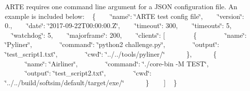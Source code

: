 A\+R\+TE requires one command line argument for a J\+S\+ON configuration file. An example is included below\+: ~\newline
 \{ ~\newline
 ~~\char`\"{}name\char`\"{}\+: \char`\"{}\+A\+R\+T\+E test config file\char`\"{}, ~\newline
 ~~\char`\"{}version\char`\"{}\+: 0., ~\newline
 ~~\char`\"{}date\char`\"{}\+: \char`\"{}2017-\/09-\/22\+T00\+:00\+:00.\+Z\char`\"{}, ~\newline
 ~~\char`\"{}timeout\char`\"{}\+: 300, ~\newline
 ~~\char`\"{}timeouts\char`\"{}\+: 5, ~\newline
 ~~\char`\"{}watchdog\char`\"{}\+: 5, ~\newline
 ~~\char`\"{}majorframe\char`\"{}\+: 200, ~\newline
 ~~\char`\"{}clients\char`\"{}\+: [ ~\newline
 ~~~~~~\{ ~\newline
 ~~~~~~\char`\"{}name\char`\"{}\+: \char`\"{}\+Pyliner\char`\"{}, ~\newline
 ~~~~~~\char`\"{}command\char`\"{}\+: \char`\"{}python2 challenge.\+py\char`\"{}, ~\newline
 ~~~~~~\char`\"{}output\char`\"{}\+: \char`\"{}test\+\_\+script1.\+txt\char`\"{}, ~\newline
 ~~~~~~\char`\"{}cwd\char`\"{}\+: \char`\"{}../../tools/pyliner/\char`\"{} ~\newline
 ~~~~\}, ~\newline
 ~~~~\{ ~\newline
 ~~~~~~\char`\"{}name\char`\"{}\+: \char`\"{}\+Airliner\char`\"{}, ~\newline
 ~~~~~~\char`\"{}command\char`\"{}\+: \char`\"{}./core-\/bin -\/\+M T\+E\+S\+T\char`\"{}, ~\newline
 ~~~~~~\char`\"{}output\char`\"{}\+: \char`\"{}test\+\_\+script2.\+txt\char`\"{}, ~\newline
 ~~~~~~\char`\"{}cwd\char`\"{}\+: \char`\"{}../../build/softsim/default/target/exe/\char`\"{} ~\newline
 ~~~~\} ~\newline
 ~~] ~\newline
 \} ~\newline




